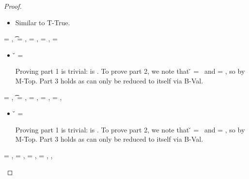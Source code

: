 \begin{lemma}
\begin{enumerate}
\begin{proof}
\begin{case}[T-True]
\begin{case}[T-Kw]

  \begin{itemize}
    \item[]
      \begin{subcase}[B-Val]
        Similar to T-True.
      \end{subcase}
  \end{itemize}
\end{case}

\end{case}

\begin{case}[T-False]
\e{} = \false, \t{} = \False, \thenprop{\prop{}} = \botprop{}, \elseprop{\prop{}} = \topprop{}, \object{} = \emptyobject{}

\begin{itemize}
  \item[] 
    \begin{subcase}[B-Val]
      \v{} = \false{}

Proving part 1 is trivial: \object{} is \emptyobject. To prove part 2, we note that \v{} = \false\ 
and \elseprop{\prop{}} = \topprop{}, so \satisfies{\openv{}}{\elseprop{\prop{}}} by M-Top. 
Part 3 holds as \e{} can only be reduced to itself via B-Val.
\end{subcase}

\end{itemize}
\end{case}

\begin{case}[T-Nil]
\e{} = \nil, \t{} = \Nil, \thenprop{\prop{}} = \botprop{}, \elseprop{\prop{}} = \topprop{}, \object{} = \emptyobject{},

\begin{itemize}
  \item[] 
    \begin{subcase}[B-Val] 
      \v{} = \nil{}

Proving part 1 is trivial: \object{} is \emptyobject. To prove part 2, we note that \v{} = \nil\ 
and \elseprop{\prop{}} = \topprop{}, so \satisfies{\openv{}}{\elseprop{\prop{}}} by M-Top. 
Part 3 holds as \e{} can only be reduced to itself via B-Val.
\end{subcase}

\end{itemize}

\end{case}

\begin{case}[T-Local]
  \e{} = \x{}, \thenprop{\prop{}} = {\notprop {\falsy{}} {\x{}}},
  \elseprop{\prop{}} = {\isprop {\falsy{}} {\x{}}},
\object{} = \x{}, 
\inpropenv{\propenv{}}{\isprop{\t{}}{\x{}}},


\end{case}
\end{proof}
\end{enumerate}
\end{lemma}
